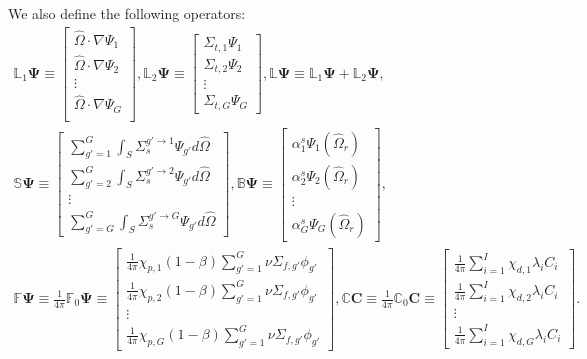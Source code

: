 %
We also define the following operators:
%
\begin{gather}
  \mathbb{L}_1\bm{\Psi} \equiv
  \begin{bmatrix}
    \hat{\Omega}\cdot\nabla\Psi_1 \\
    \hat{\Omega}\cdot\nabla\Psi_2 \\
    \vdots \\
    \hat{\Omega}\cdot\nabla\Psi_G \\
  \end{bmatrix},
  \mathbb{L}_2\bm{\Psi} \equiv
  \begin{bmatrix}
    \Sigma_{t,1}\Psi_1 \\
    \Sigma_{t,2}\Psi_2 \\
    \vdots \\
    \Sigma_{t,G}\Psi_G
  \end{bmatrix},
  \mathbb{L}\bm{\Psi} \equiv \mathbb{L}_1\bm{\Psi} + \mathbb{L}_2\bm{\Psi}, \nonumber \\
  \mathbb{S}\bm{\Psi} \equiv
  \begin{bmatrix}
    \sum^G_{g'=1}\int_S \Sigma_s^{g'\rightarrow 1}\Psi_{g'}d\hat{\Omega} \\
    \sum^G_{g'=2}\int_S \Sigma_s^{g'\rightarrow 2}\Psi_{g'}d\hat{\Omega} \\
    \vdots \\
    \sum^G_{g'=G}\int_S \Sigma_s^{g'\rightarrow G}\Psi_{g'}d\hat{\Omega}
  \end{bmatrix},
  \mathbb{B}\bm{\Psi} \equiv
  \begin{bmatrix}
    \alpha^s_1\Psi_1(\hat{\Omega}_r) \\
    \alpha^s_2\Psi_2(\hat{\Omega}_r) \\
    \vdots \\
    \alpha^s_G\Psi_G(\hat{\Omega}_r)
  \end{bmatrix}, \nonumber \\
  \mathbb{F}\bm{\Psi} \equiv \frac{1}{4\pi}\mathbb{F}_0\bm{\Psi} \equiv
  \begin{bmatrix}
    \frac{1}{4\pi}\chi_{p,1}(1-\beta)\sum^G_{g'=1}\nu\Sigma_{f,g'}\phi_{g'} \\
    \frac{1}{4\pi}\chi_{p,2}(1-\beta)\sum^G_{g'=1}\nu\Sigma_{f,g'}\phi_{g'} \\
    \vdots \\
    \frac{1}{4\pi}\chi_{p,G}(1-\beta)\sum^G_{g'=1}\nu\Sigma_{f,g'}\phi_{g'}
  \end{bmatrix},
  \mathbb{C}\bm{C} \equiv \frac{1}{4\pi}\mathbb{C}_0\bm{C} \equiv
  \begin{bmatrix}
    \frac{1}{4\pi}\sum^I_{i=1}\chi_{d,1} \lambda_i C_i \\
    \frac{1}{4\pi}\sum^I_{i=1}\chi_{d,2} \lambda_i C_i \\
    \vdots \\
    \frac{1}{4\pi}\sum^I_{i=1}\chi_{d,G} \lambda_i C_i
  \end{bmatrix}. \nonumber
\end{gather}
